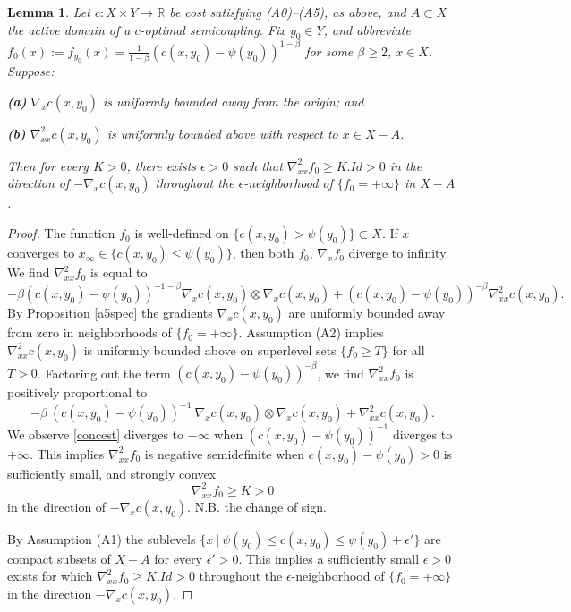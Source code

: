 \documentclass[12pt]{amsart}
\newtheorem{lem}{Lemma}
\theoremstyle{definition}
\theoremstyle{remark}
\newcommand{\bR}{\mathbb{R}}
\begin{document}

\begin{lem}\label{conc} 
Let $c: X\times Y \to \bR$ be cost satisfying (A0)--(A5), as above, and $A\subset X$ the active domain of a $c$-optimal semicoupling. Fix $y_0\in Y$, and abbreviate $f_0(x):=f_{y_0}(x)=\frac{1}{1-\beta}(c(x,y_0)-\psi(y_0))^{1-\beta}$ for some $\beta\geq 2$, $x\in X$. 
Suppose:

\textbf{(a)} $\nabla_x c(x,y_0)$ is uniformly bounded away from the origin; and

\textbf{(b)}  $\nabla^2_{xx} c(x,y_0)$ is uniformly bounded above with respect to $x\in X-A$.

Then for every $K>0$, there exists $\epsilon>0$ such that $\nabla_{xx}^2 f_0\geq K.Id>0$ in the direction of $-\nabla_x c(x,y_0)$ throughout the $\epsilon$-neighborhood of $\{f_0=+\infty\}$ in $X-A$.


\end{lem}
\begin{proof}
The function $f_0$ is well-defined on $\{c(x,y_0)>\psi(y_0)\} \subset X$. If $x$ converges to $x_\infty \in \{c(x,y_0) \leq \psi(y_0)\}$, then both $f_0$, $\nabla_x f_0$ diverge to infinity.  We find $\nabla^2_{xx} f_0$ is equal to $$-\beta (c(x,y_0)-\psi(y_0))^{-1-\beta} \nabla_x c(x,y_0) \otimes \nabla_x c(x,y_0)+(c(x,y_0)-\psi(y_0))^{-\beta} \nabla^2_{xx} c(x,y_0).$$ By Proposition \ref{a5spec} the gradients $\nabla_x c(x,y_0)$ are uniformly bounded away from zero in neighborhoods of $\{f_0=+\infty\}$. Assumption (A2) implies $\nabla^2_{xx} c(x,y_0)$ is uniformly bounded above on superlevel sets $\{f_0 \geq T\}$ for all $T>0$. Factoring out the term $(c(x,y_0)-\psi(y_0))^{-\beta}$, we find $\nabla_{xx}^2 f_0$ is positively proportional to \begin{equation}\label{concest} -\beta~(c(x,y_0)-\psi(y_0))^{-1}~\nabla_x c(x,y_0) \otimes \nabla_x c(x,y_0) + \nabla_{xx}^2 c(x,y_0).\end{equation} We observe \eqref{concest} diverges to $-\infty$ when $(c(x,y_0)-\psi(y_0))^{-1}$ diverges to $+\infty$. This implies $\nabla^2_{xx} f_0$ is negative semidefinite when $c(x,y_0)-\psi(y_0)>0$ is sufficiently small, and strongly convex $$\nabla_{xx}^2 f_0 \geq K >0$$ in the direction of $-\nabla_x c(x,y_0)$. N.B. the change of sign. 

By Assumption (A1) the sublevels $\{x ~|~\psi(y_0)\leq c(x,y_0) \leq \psi(y_0)+\epsilon'\}$ are compact subsets of $X-A$ for every $\epsilon'>0$. This implies a sufficiently small $\epsilon>0$ exists for which $\nabla^2_{xx} f_0\geq K.Id>0$ throughout the $\epsilon$-neighborhood of $\{f_0=+\infty\}$ in the direction $-\nabla_x c(x,y_0)$. 
\end{proof}
\end{document}
